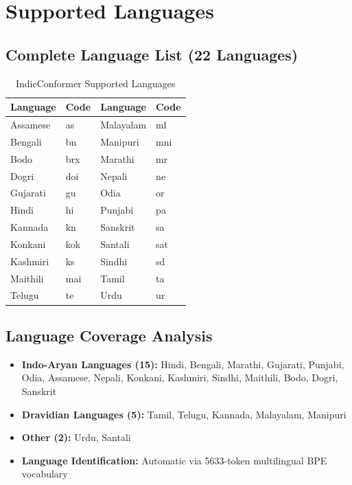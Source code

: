 \documentclass[12pt,a4paper]{article}
\begin{document}
\section{Supported Languages}

\subsection{Complete Language List (22 Languages)}

\begin{table}[h]
\centering
\caption{IndicConformer Supported Languages}
\begin{tabular}{@{}llll@{}}
\toprule
\textbf{Language} & \textbf{Code} & \textbf{Language} & \textbf{Code} \\
\midrule
Assamese & as & Malayalam & ml \\
Bengali & bn & Manipuri & mni \\
Bodo & brx & Marathi & mr \\
Dogri & doi & Nepali & ne \\
Gujarati & gu & Odia & or \\
Hindi & hi & Punjabi & pa \\
Kannada & kn & Sanskrit & sa \\
Konkani & kok & Santali & sat \\
Kashmiri & ks & Sindhi & sd \\
Maithili & mai & Tamil & ta \\
Telugu & te & Urdu & ur \\
\bottomrule
\end{tabular}
\end{table}

\subsection{Language Coverage Analysis}

\begin{itemize}[leftmargin=*]
\item \textbf{Indo-Aryan Languages (15):} Hindi, Bengali, Marathi, Gujarati, Punjabi, Odia, Assamese, Nepali, Konkani, Kashmiri, Sindhi, Maithili, Bodo, Dogri, Sanskrit
\item \textbf{Dravidian Languages (5):} Tamil, Telugu, Kannada, Malayalam, Manipuri
\item \textbf{Other (2):} Urdu, Santali
\item \textbf{Language Identification:} Automatic via 5633-token multilingual BPE vocabulary
\end{itemize}
\end{document}
